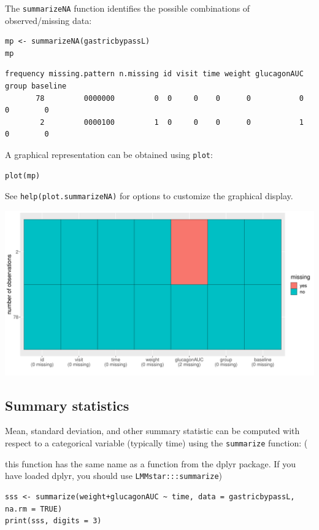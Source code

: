 \documentclass[12pt]{article}
\newcommand\Warning[1][3ex]{%
\renewcommand\stacktype{L}%
\scaleto{\stackon[1.3pt]{\color{red}$\triangle$}{\tiny\bfseries !}}{#1}%
\xspace
}
\begin{document}
The \texttt{summarizeNA} function identifies the possible combinations of
observed/missing data:
\lstset{language=r,label= ,caption= ,captionpos=b,numbers=none}
\begin{lstlisting}
mp <- summarizeNA(gastricbypassL)
mp
\end{lstlisting}

\begin{verbatim}
frequency missing.pattern n.missing id visit time weight glucagonAUC group baseline
       78         0000000         0  0     0    0      0           0     0        0
        2         0000100         1  0     0    0      0           1     0        0
\end{verbatim}


A graphical representation can be obtained using \texttt{plot}:
\lstset{language=r,label= ,caption= ,captionpos=b,numbers=none}
\begin{lstlisting}
plot(mp)
\end{lstlisting}

See \texttt{help(plot.summarizeNA)} for options to customize the graphical
display.

\begin{center}
\includegraphics[trim={0 0 0 0},width=1\textwidth]{./figures/summarizeNA.pdf}
\end{center}



\clearpage

\subsection{Summary statistics}
\label{sec:orgbc363e8}

Mean, standard deviation, and other summary statistic can be computed
with respect to a categorical variable (typically time) using the
\texttt{summarize} function: \newline (\Warning this function has the same
name as a function from the dplyr package. If you have loaded dplyr,
you should use \texttt{LMMstar:::summarize})
\lstset{language=r,label= ,caption= ,captionpos=b,numbers=none}
\begin{lstlisting}
sss <- summarize(weight+glucagonAUC ~ time, data = gastricbypassL, na.rm = TRUE)
print(sss, digits = 3)
\end{lstlisting}
\end{document}
